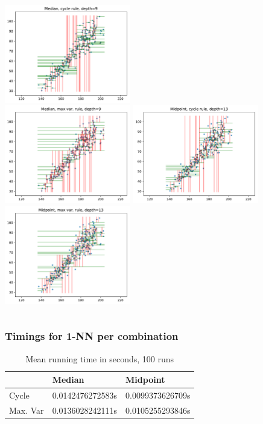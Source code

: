 \documentclass{beamer}
\begin{document}
\begin{frame}
	\begin{columns}[t]
		\centering
		\includegraphics[width=5.5cm]{graphics/median_cycle}\\
		\includegraphics[width=5.5cm]{graphics/median_maxvar}
		\centering
		\includegraphics[width=5.5cm]{graphics/midpoint_cycle}\\
		\includegraphics[width=5.5cm]{graphics/midpoint_maxvar}
	\end{columns}
\end{frame}

\begin{frame}
	\frametitle{Timings for 1-NN per combination}
	\begin{table}[]
		\centering
		\label{my-label}
		\begin{tabular}{l|l|l}
			& Median          & Midpoint        \\ \hline
			Cycle    & 0.0142476272583s & 0.0099373626709s \\ \hline
			Max. Var & 0.0136028242111s & 0.0105255293846s \\ 
		\end{tabular}
	\caption{Mean running time in seconds, 100 runs}
	\end{table}
\end{frame}



%
%

\end{document}
